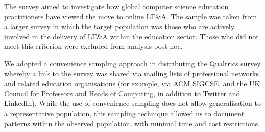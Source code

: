 \documentclass[conference]{IEEEtran}
\begin{document}

The survey aimed to investigate how global computer science education
practitioners have viewed the move to online LT\&A. The sample was
taken from a larger survey in which the target population was those
who are actively involved in the delivery of LT\&A within the
education sector. Those who did not meet this criterion were excluded
from analysis post-hoc.


We adopted a convenience sampling approach in distributing the
Qualtrics survey whereby a link to the survey was shared via mailing
lists of professional networks and related education organisations
(for example, via ACM SIGCSE, and the UK Council for Professors and
Heads of Computing, in addition to Twitter and LinkedIn). While the
use of convenience sampling does not allow generalisation to a
representative population, this sampling technique allowed us to
document patterns within the observed population, with minimal time
and cost restrictions.

\end{document}
